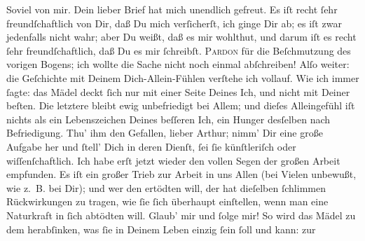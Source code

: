 \begin{ledgroupsized}[t]{13cm}
           Soviel von mir. Dein lieber Brief hat mich unendlich gefreut. Es iſt recht ſehr
               freundſchaftlich von Dir, daß Du mich verſicherſt, ich ginge Dir ab; es iſt zwar
               jedenfalls nicht wahr; aber Du weißt, daß es mir wohlthut, und darum iſt es recht
               ſehr freundſchaftlich, daß Du es mir ſchreibſt.\pend
           \pstart
           {\pb}\textsc{Pardon} für die Beſchmutzung des vorigen Bogens; ich wollte
               die Sache nicht noch einmal abſchreiben!\pend
           \pstart
           Alſo weiter: die Geſchichte mit Deinem Dich-Allein-Fühlen verſtehe ich vollauf. Wie
               ich immer ſagte: das Mädel deckt ſich nur mit einer Seite Deines Ich, und nicht
               mit Deiner beſten. Die letztere bleibt ewig unbefriedigt bei Allem; und dieſes
               Alleingefühl iſt nichts als ein Lebenszeichen Deines beſſeren Ich, ein Hunger
               desſelben nach Befriedigung. Thu’ ihm den Gefallen, lieber Arthur; nimm’ Dir eine
               große Aufgabe her und ſtell’ Dich in deren Dienſt, ſei ſie künſtleriſch oder
               wiſſenſchaftlich. Ich habe erſt jetzt wieder den vollen Segen der großen Arbeit
               empfunden. Es iſt ein großer Trieb zur {\pb}Arbeit in
               uns Allen (bei Vielen unbewußt, wie z. B. bei Dir); und wer den  ertödten will, der hat dieſelben ſchlimmen
               Rückwirkungen zu tragen, wie ſie ſich überhaupt einſtellen, wenn man eine Naturkraft
               in ſich abtödten will. Glaub’ mir und ſolge mir! So wird das Mädel zu dem herabſinken, was
               ſie in Deinem Leben einzig ſein ſoll und kann: zur \label{K_L02661-2v}
\end{ledgroupsized}
